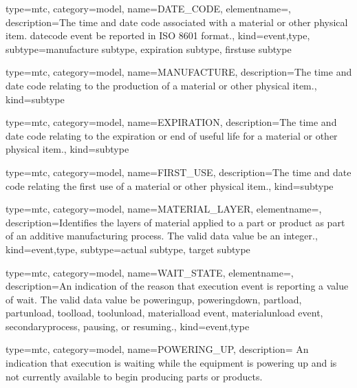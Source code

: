 {
  type=mtc,
  category=model,
  name={DATE\_CODE},
  elementname=,
  description={The time and date code associated with a material or other physical item.
  \newline \gls{datecode event} \MUST be reported in ISO 8601 format.},
  kind={event,type},
  subtype={\gls{manufacture subtype}, \gls{expiration subtype}, \gls{firstuse subtype}}
}


{
  type=mtc,
  category=model,
  name={MANUFACTURE},
  description={The time and date code relating to the production of a material or other physical item.},
  kind={subtype}
}


{
  type=mtc,
  category=model,
  name={EXPIRATION},
  description={The time and date code relating to the expiration or end of useful life for a material or other physical item.},
  kind={subtype}
}


{
  type=mtc,
  category=model,
  name={FIRST\_USE},
  description={The time and date code relating the first use of a material or other physical item.},
  kind={subtype}
}


{
  type=mtc,
  category=model,
  name={MATERIAL\_LAYER},
  elementname=,
  description={Identifies the layers of material applied to a part or product as part of an additive manufacturing process.
  \newline The \gls{valid data value} \MUST be an integer.},
  kind={event,type},
  subtype={\gls{actual subtype}, \gls{target subtype}}
}


{
  type=mtc,
  category=model,
  name={WAIT\_STATE},
  elementname=,
  description={An indication of the reason that \gls{execution event} is reporting a value of \gls{wait}.
  \newline The \gls{valid data value} \MUST be \gls{poweringup}, \gls{poweringdown}, \gls{partload}, \gls{partunload}, \gls{toolload}, \gls{toolunload}, \gls{materialload event}, \gls{materialunload event}, \gls{secondaryprocess}, \gls{pausing}, or \gls{resuming}.},
  kind={event,type}
}


{
  type=mtc,
  category=model,
  name={POWERING\_UP},
  description={ An indication that execution is waiting while the equipment is powering up and is not currently available to begin producing parts or products.}
}


